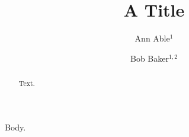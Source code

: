 \documentclass{llncs}
\begin{document}
\title{A Title}
\author{Ann Able$^{1}$ \and Bob Baker$^{1,2}$}
\maketitle
\begin{abstract}Text.\end{abstract}
Body.
\end{document}
